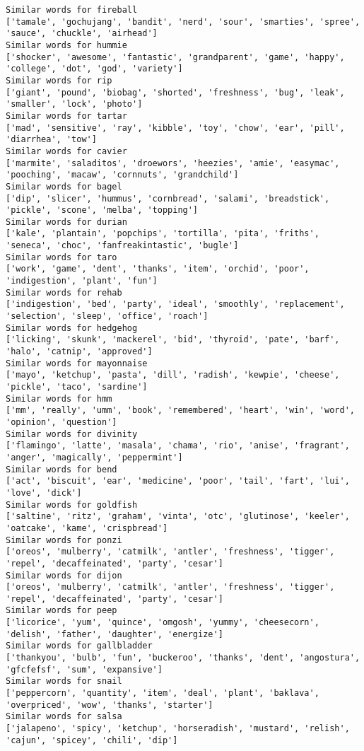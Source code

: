 \documentclass[11pt]{article}
\begin{document}
\begin{Verbatim}[commandchars=\\\{\}]
Similar words for fireball
['tamale', 'gochujang', 'bandit', 'nerd', 'sour', 'smarties', 'spree', 'sauce', 'chuckle', 'airhead']
Similar words for hummie
['shocker', 'awesome', 'fantastic', 'grandparent', 'game', 'happy', 'college', 'dot', 'god', 'variety']
Similar words for rip
['giant', 'pound', 'biobag', 'shorted', 'freshness', 'bug', 'leak', 'smaller', 'lock', 'photo']
Similar words for tartar
['mad', 'sensitive', 'ray', 'kibble', 'toy', 'chow', 'ear', 'pill', 'diarrhea', 'tow']
Similar words for cavier
['marmite', 'saladitos', 'droewors', 'heezies', 'amie', 'easymac', 'pooching', 'macaw', 'cornnuts', 'grandchild']
Similar words for bagel
['dip', 'slicer', 'hummus', 'cornbread', 'salami', 'breadstick', 'pickle', 'scone', 'melba', 'topping']
Similar words for durian
['kale', 'plantain', 'popchips', 'tortilla', 'pita', 'friths', 'seneca', 'choc', 'fanfreakintastic', 'bugle']
Similar words for taro
['work', 'game', 'dent', 'thanks', 'item', 'orchid', 'poor', 'indigestion', 'plant', 'fun']
Similar words for rehab
['indigestion', 'bed', 'party', 'ideal', 'smoothly', 'replacement', 'selection', 'sleep', 'office', 'roach']
Similar words for hedgehog
['licking', 'skunk', 'mackerel', 'bid', 'thyroid', 'pate', 'barf', 'halo', 'catnip', 'approved']
Similar words for mayonnaise
['mayo', 'ketchup', 'pasta', 'dill', 'radish', 'kewpie', 'cheese', 'pickle', 'taco', 'sardine']
Similar words for hmm
['mm', 'really', 'umm', 'book', 'remembered', 'heart', 'win', 'word', 'opinion', 'question']
Similar words for divinity
['flamingo', 'latte', 'masala', 'chama', 'rio', 'anise', 'fragrant', 'anger', 'magically', 'peppermint']
Similar words for bend
['act', 'biscuit', 'ear', 'medicine', 'poor', 'tail', 'fart', 'lui', 'love', 'dick']
Similar words for goldfish
['saltine', 'ritz', 'graham', 'vinta', 'otc', 'glutinose', 'keeler', 'oatcake', 'kame', 'crispbread']
Similar words for ponzi
['oreos', 'mulberry', 'catmilk', 'antler', 'freshness', 'tigger', 'repel', 'decaffeinated', 'party', 'cesar']
Similar words for dijon
['oreos', 'mulberry', 'catmilk', 'antler', 'freshness', 'tigger', 'repel', 'decaffeinated', 'party', 'cesar']
Similar words for peep
['licorice', 'yum', 'quince', 'omgosh', 'yummy', 'cheesecorn', 'delish', 'father', 'daughter', 'energize']
Similar words for gallbladder
['thankyou', 'bulb', 'fun', 'buckeroo', 'thanks', 'dent', 'angostura', 'gfcfefsf', 'sum', 'expansive']
Similar words for snail
['peppercorn', 'quantity', 'item', 'deal', 'plant', 'baklava', 'overpriced', 'wow', 'thanks', 'starter']
Similar words for salsa
['jalapeno', 'spicy', 'ketchup', 'horseradish', 'mustard', 'relish', 'cajun', 'spicey', 'chili', 'dip']

\end{Verbatim}
\end{document}
